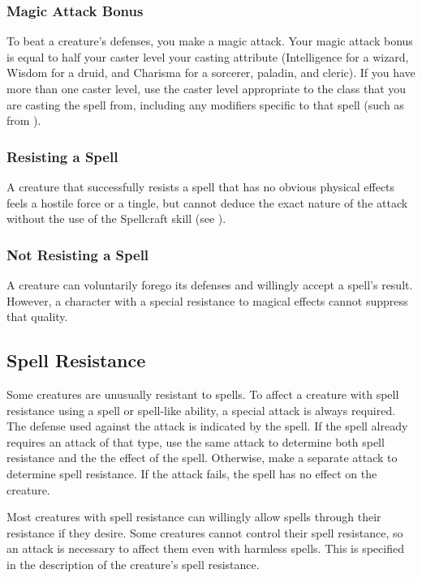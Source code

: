 \subsubsection{Magic Attack Bonus}\label{Magic Attack Bonus}
To beat a creature's defenses, you make a magic attack. Your magic attack bonus is equal to half your caster level \add your casting attribute (Intelligence for a wizard, Wisdom for a druid, and Charisma for a sorcerer, paladin, and cleric). If you have more than one caster level, use the caster level appropriate to the class that you are casting the spell from, including any modifiers specific to that spell (such as from ).

\subsubsection{Resisting a Spell} A creature that successfully resists a spell that has no obvious physical effects feels a hostile force or a tingle, but cannot deduce the exact nature of the attack without the use of the Spellcraft skill (see ).

\subsubsection{Not Resisting a Spell} A creature can voluntarily forego its defenses and willingly accept a spell's result. However, a character with a special resistance to magical effects cannot suppress that quality.

\subsection{Spell Resistance}
Some creatures are unusually resistant to spells. To affect a creature with spell resistance using a spell or spell-like ability, a special attack is always required. The defense used against the attack is indicated by the spell. If the spell already requires an attack of that type, use the same attack to determine both spell resistance and the the effect of the spell. Otherwise, make a separate attack to determine spell resistance. If the attack fails, the spell has no effect on the creature.

Most creatures with spell resistance can willingly allow spells through their resistance if they desire. Some creatures cannot control their spell resistance, so an attack is necessary to affect them even with harmless spells. This is specified in the description of the creature's spell resistance.

